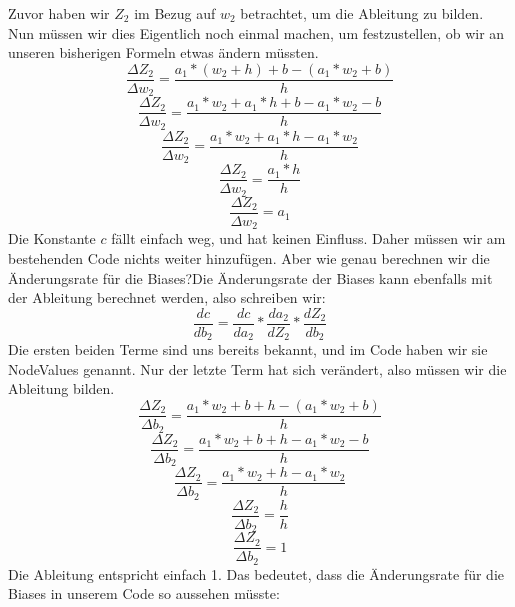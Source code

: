 \documentclass[12pt]{article}
\begin{document}
Zuvor haben wir $Z_2$ im Bezug auf $w_2$ betrachtet, um die Ableitung zu bilden. Nun müssen wir dies Eigentlich noch einmal machen, um festzustellen, ob wir an unseren bisherigen Formeln etwas ändern müssten.
$$\frac{\Delta Z_2 }{\Delta w_2 } = \frac{ a_1 * (w_2+h) + b -(a_1 * w_2 + b) }{ h }$$
$$\frac{\Delta Z_2 }{\Delta w_2 } = \frac{ a_1*w_2+a_1*h + b -a_1 * w_2 - b }{ h }$$
$$\frac{\Delta Z_2 }{\Delta w_2 } = \frac{ a_1*w_2+a_1*h-a_1 * w_2 }{ h }$$
$$\frac{\Delta Z_2 }{\Delta w_2 } = \frac{a_1*h }{ h }$$
$$\frac{\Delta Z_2 }{\Delta w_2 } = a_1$$
Die Konstante $c$ fällt einfach weg, und hat keinen Einfluss. Daher müssen wir am bestehenden Code nichts weiter hinzufügen. Aber wie genau berechnen wir die Änderungsrate für die Biases?Die Änderungsrate der Biases kann ebenfalls mit der Ableitung berechnet werden, also schreiben wir:
$$\frac{ dc }{ db_{ 2 } }=
\frac{ dc }{ da_{ 2 } }*
\frac{ da_{ 2 } }{ dZ_{ 2 } }*
\frac{ dZ_{ 2 } }{ db_{ 2 } }$$
Die ersten beiden Terme sind uns bereits bekannt, und im Code haben wir sie NodeValues genannt. Nur der letzte Term hat sich verändert, also müssen wir die Ableitung bilden.
$$\frac{\Delta Z_2 }{\Delta b_2 } = \frac{ a_1 * w_2 + b+h -(a_1 * w_2 + b) }{ h }$$
$$\frac{\Delta Z_2 }{\Delta b_2 } = \frac{ a_1 * w_2 + b+h -a_1 * w_2 - b }{ h }$$
$$\frac{\Delta Z_2 }{\Delta b_2 } = \frac{ a_1 * w_2 +h -a_1 * w_2 }{ h }$$
$$\frac{\Delta Z_2 }{\Delta b_2 } = \frac{ h  }{ h }$$
$$\frac{\Delta Z_2 }{\Delta b_2 } = 1$$
Die Ableitung entspricht einfach 1. Das bedeutet, dass die Änderungsrate für die Biases in unserem Code so aussehen müsste:
\end{document}
